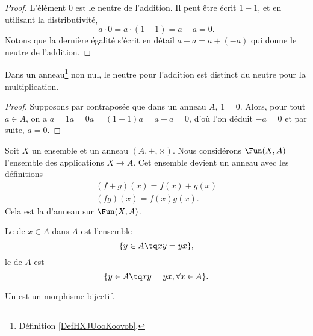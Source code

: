 \begin{proof}
    L'élément \( 0\) est le neutre de l'addition. Il peut être écrit \( 1-1\), et en utilisant la distributivité,
    \begin{equation}
        a\cdot 0=a\cdot (1-1)=a-a=0.
    \end{equation}
    Notons que la dernière égalité s'écrit en détail \( a-a=a+(-a)\) qui donne le neutre de l'addition.
\end{proof}

\begin{proposition}     \label{PROPooNCCGooXjVyVt}
    Dans un anneau\footnote{Définition \ref{DefHXJUooKoovob}.} non nul, le neutre pour l'addition est distinct du neutre pour la multiplication.
\end{proposition}
\begin{proof}
    Supposons par contraposée que dans un anneau $A$, \( 1 = 0 \). Alors, pour tout \( a \in A \), on a \( a = 1a = 0a = (1 - 1)a = a - a=0 \), d'où l'on déduit \( -a = 0  \) et par suite, \( a = 0. \)
\end{proof}

Soit \( X\) un ensemble et un anneau $(A, +, \times)$. Nous considérons \( \Fun(X,A)\) l'ensemble des applications \( X\to A\). Cet ensemble devient un anneau avec les définitions
\begin{subequations}
    \begin{align}
        (f+g)(x)=f(x)+g(x)\\
        (fg)(x)=f(x)g(x).
    \end{align}
\end{subequations}
Cela est la  d'anneau sur \( \Fun(X,A)\).

\begin{definition}
    Le  de \( x\in A\) dans \( A\) est l'ensemble
    \begin{equation}
        \{ y\in A\tq xy=yx \},
    \end{equation}
    le  de \( A\) est
    \begin{equation}
        \{ y\in A\tq xy=yx,\forall x\in A \}.
    \end{equation}
\end{definition}


\begin{definition}
    Un  est un morphisme bijectif.
\end{definition}

